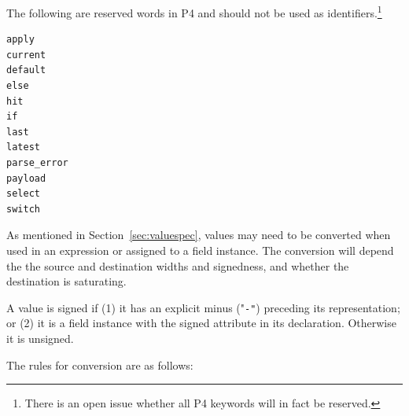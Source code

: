 \documentclass[12pt]{article}
\begin{document}

The following are reserved words in P4 and should not be used as identifiers.\footnote{There is an open issue whether all P4 keywords will in fact be reserved.}

\begin{Verbatim}[commandchars=\\\{\}]
apply
current
default
else
hit
if
last
latest
parse_error
payload
select
switch
\end{Verbatim}



As mentioned in Section~\ref{sec:valuespec}, values may need to be 
converted when used in an expression or assigned to a field instance. The 
conversion will depend the the source and destination widths and signedness, 
and whether the destination is saturating. 

A value is signed if (1) it has an explicit minus ("\texttt{-"}) preceding its representation; 
or (2) it is a field instance with the signed attribute in its declaration. 
Otherwise it is unsigned.

The rules for conversion are as follows:
\end{document}
